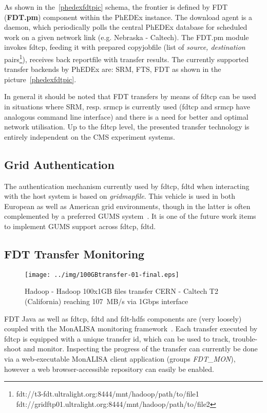 \documentclass[a4paper]{jpconf}
\begin{document}
As shown in the~\ref{phedexfdtpic} schema,
the frontier is defined by FDT ({\bf FDT.pm}) component within the PhEDEx
instance. The download agent is a daemon, which periodically polls the
central PhEDEx database for scheduled work on a given network link
(e.g. Nebraska - Caltech). The FDT.pm module invokes fdtcp,
feeding it with prepared copyjobfile (list of \emph{source, destination}
pairs\footnote{fdt://t3-fdt.ultralight.org:8444/mnt/hadoop/path/to/file1
fdt://gridftp01.ultralight.org:8444/mnt/hadoop/path/to/file2}), receives
back reportfile with transfer results.
The currently supported transfer backends by PhEDEx are: SRM, FTS,
FDT as shown in the picture~\ref{phedexfdtpic}.

In general it should be noted that FDT transfers by means of fdtcp can be used
in situations where SRM, resp. srmcp is currently used (fdtcp and srmcp have
analogous command line interface) and there is a need for better and optimal
network utilisation. Up to the fdtcp level, the presented
transfer technology is entirely independent on the CMS experiment systems.


\subsection{Grid Authentication}
The authentication mechanism currently used by fdtcp, fdtd when interacting
with the host system is based on \emph{gridmapfile}. This vehicle is used in
both European as well as American grid environments, though in the latter is
often complemented by a preferred GUMS system~\cite{gums}. It is one of the
future work items to implement GUMS support across fdtcp, fdtd.

\subsection{FDT Transfer Monitoring}

\begin{figure}[h]
\texttt{[image: ../img/100GBtransfer-01-final.eps]}
\hspace{0.5cm}
\begin{minipage}[b]{4cm}
\caption{\label{mlpic1} Hadoop - Hadoop 100x1GB files transfer CERN - 
Caltech T2 (California) reaching 107~MB/s via 1Gbps interface}
\end{minipage}
\end{figure}


FDT Java as well as fdtcp, fdtd and fdt-hdfs components
are (very loosely) coupled with the MonALISA monitoring
framework~\cite{monalisa}. Each transfer executed by fdtcp is equipped with a
unique transfer id, which can be used to track, trouble-shoot and monitor.
Inspecting the progress of the transfer can currently be done via a
web-executable MonALISA client application (groups \emph{FDT\_MON}), however
a web browser-accessible repository can easily be enabled.
\end{document}
